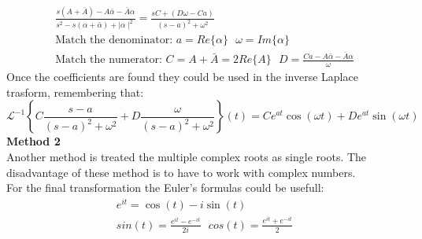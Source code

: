 \documentclass[a4paper,12pt]{article}
\begin{document}
	\begin{gather}
		\frac{s(A+\bar A)-A \bar \alpha - \bar A \alpha}{s^2-s(\alpha + \bar \alpha) + \mid \alpha \mid ^2} = 
		\frac{s C + ( D \omega -C a)}{(s-a)^2+\omega^2}
		\label{Complex_single_roots_ver2}\\
		\text{Match the denominator: } a=Re\{ \alpha \} \ \ \ \omega= Im\{ \alpha \} \\
		\text{Match the numerator: } C=A + \bar A=2 Re\{ A \} \ \ \ D=\frac{C a - A \bar \alpha - \bar A \alpha}{\omega}
		\label{Complex_single_roots_coeff_ver2}
	\end{gather}
	Once the coefficients are found they could be used in the inverse Laplace trasform, remembering that:
	\begin{equation}
		\mathcal{L}^{-1} \left\{ C \frac{s-a}{(s-a)^2+ \omega ^2} + D \frac{ \omega }{(s-a)^2+ \omega ^2} \right\} (t) = C e^{a t} \cos(\omega t) + D e^{a t} \sin(\omega t) 
		\label{Complex_single_roots_coeff_ver3}
	\end{equation}
	\textbf{Method 2} \\
	Another method is treated the multiple complex roots as single roots. The disadvantage of these method is to have to work with complex numbers.\\
	For the final transformation the Euler's formulas could be usefull: 
	\begin{gather}
		e^{it}=\cos(t)-i\sin(t)
		\label{Euler_1}\\
		sin(t)=\frac{e^{it}-e^{-it}}{2i} \ \ \ cos(t)=\frac{e^{it}+e^{-it}}{2}
		\label{Euler_2}
	\end{gather}
\end{document}
